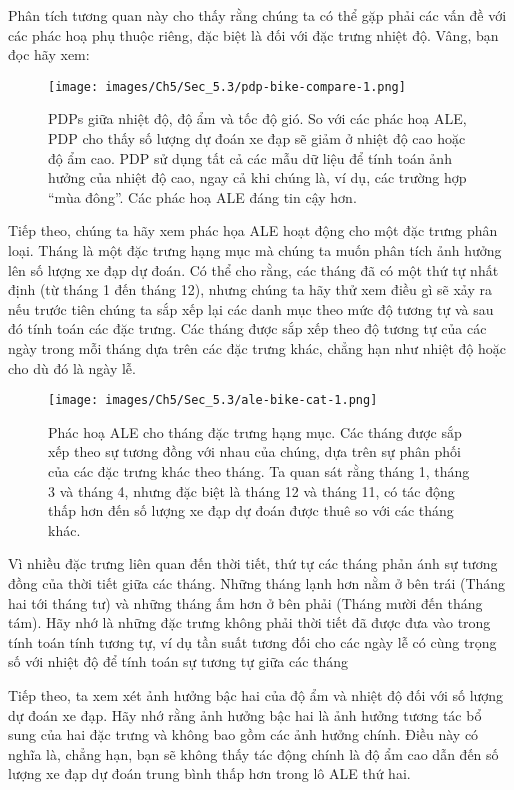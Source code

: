 Phân tích tương quan này cho thấy rằng chúng ta có thể gặp phải các vấn đề với các phác hoạ phụ thuộc riêng, đặc biệt là đối với đặc trưng nhiệt độ. Vâng, bạn đọc hãy xem:

\begin{figure*}[h!]
	\centering
	\texttt{[image: images/Ch5/Sec\_5.3/pdp-bike-compare-1.png]}
	\label{fig:5_18}
	\caption{PDPs giữa nhiệt độ, độ ẩm và tốc độ gió. So với các phác hoạ ALE, PDP cho thấy số lượng dự đoán xe đạp sẽ giảm ở nhiệt độ cao hoặc độ ẩm cao. PDP sử dụng tất cả các mẫu dữ liệu để tính toán ảnh hưởng của nhiệt độ cao, ngay cả khi chúng là, ví dụ, các trường hợp ``mùa đông''. Các phác hoạ ALE đáng tin cậy hơn.}
\end{figure*}


Tiếp theo, chúng ta hãy xem phác họa ALE hoạt động cho một đặc trưng phân loại. Tháng là một đặc trưng hạng mục mà chúng ta muốn phân tích ảnh hưởng lên số lượng xe đạp dự đoán. Có thể cho rằng, các tháng đã có một thứ tự nhất định (từ tháng 1 đến tháng 12), nhưng chúng ta hãy thử xem điều gì sẽ xảy ra nếu trước tiên chúng ta sắp xếp lại các danh mục theo mức độ tương tự và sau đó tính toán các đặc trưng. Các tháng được sắp xếp theo độ tương tự của các ngày trong mỗi tháng dựa trên các đặc trưng khác, chẳng hạn như nhiệt độ hoặc cho dù đó là ngày lễ.

\begin{figure*}[h!]
	\centering
	\texttt{[image: images/Ch5/Sec\_5.3/ale-bike-cat-1.png]}
	\label{fig:5_19}
	\caption{Phác hoạ ALE cho tháng đặc trưng hạng mục. Các tháng được sắp xếp theo sự tương đồng với nhau của chúng, dựa trên sự phân phối của các đặc trưng khác theo tháng. Ta quan sát rằng tháng 1, tháng 3 và tháng 4, nhưng đặc biệt là tháng 12 và tháng 11, có tác động thấp hơn đến số lượng xe đạp dự đoán được thuê so với các tháng khác.}
\end{figure*}

Vì nhiều đặc trưng liên quan đến thời tiết, thứ tự các tháng phản ánh sự tương đồng của thời tiết giữa các tháng. Những tháng lạnh hơn nằm ở bên trái (Tháng hai tới tháng tư) và những tháng ấm hơn ở bên phải (Tháng mười đến tháng tám). Hãy nhớ là những đặc trưng không phải thời tiết đã được đưa vào trong tính toán tính tương tự, ví dụ tần suất tương đối cho các ngày lễ có cùng trọng số với nhiệt độ để tính toán sự tương tự giữa các tháng  

Tiếp theo, ta xem xét ảnh hưởng bậc hai của độ ẩm và nhiệt độ đối với số lượng dự đoán xe đạp. Hãy nhớ rằng ảnh hưởng bậc hai là ảnh hưởng tương tác bổ sung của hai đặc trưng và không bao gồm các ảnh hưởng chính. Điều này có nghĩa là, chẳng hạn, bạn sẽ không thấy tác động chính là độ ẩm cao dẫn đến số lượng xe đạp dự đoán trung bình thấp hơn trong lô ALE thứ hai.

